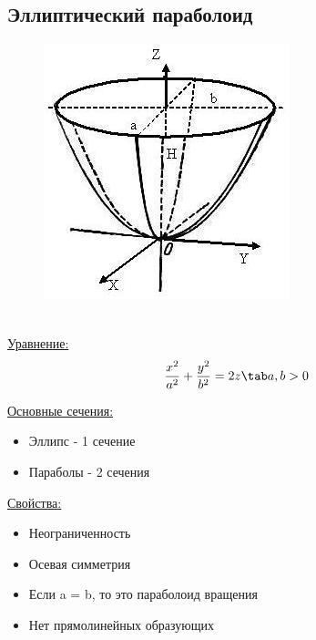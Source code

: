 \subsection{Эллиптический параболоид}
\begin{figure}
    \includegraphics[width=1.0\linewidth]{images/эллиптический параболоид.JPG}
\end{figure}

\tab\\

\underline{Уравнение:}
\[
\dfrac{x^2}{a^2} + \dfrac{y^2}{b^2} = 2z \tab a, b > 0
\]

\underline{Основные сечения:}
\begin{itemize}
    \item Эллипс - 1 сечение
    \item Параболы - 2 сечения
\end{itemize}

\underline{Свойства:}
\begin{itemize}
    \item Неограниченность
    \item Осевая симметрия
    \item Если a = b, то это параболоид вращения
    \item Нет прямолинейных образующих
\end{itemize}
\tab\\ \tab\\ \tab\\ \tab\\
